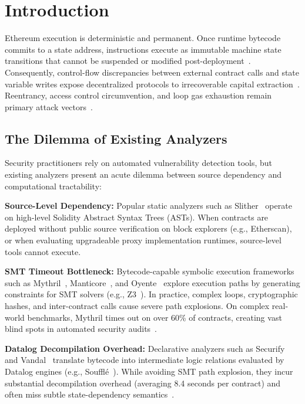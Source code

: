 \documentclass[conference]{IEEEtran}
\begin{document}
\section{Introduction}\label{sec:intro}

Ethereum execution is deterministic and permanent. Once runtime bytecode commits to a state address, instructions execute as immutable machine state transitions that cannot be suspended or modified post-deployment~\cite{wood2014ethereum}. Consequently, control-flow discrepancies between external contract calls and state variable writes expose decentralized protocols to irrecoverable capital extraction~\cite{zhou2023sok,chen2020survey,atzei2017survey}. Reentrancy, access control circumvention, and loop gas exhaustion remain primary attack vectors~\cite{daian2020flash}.

\subsection{The Dilemma of Existing Analyzers}
Security practitioners rely on automated vulnerability detection tools, but existing analyzers present an acute dilemma between source dependency and computational tractability:

\smallskip
\noindent\textbf{Source-Level Dependency:} Popular static analyzers such as Slither~\cite{feist2019slither} operate on high-level Solidity Abstract Syntax Trees (ASTs). When contracts are deployed without public source verification on block explorers (e.g., Etherscan), or when evaluating upgradeable proxy implementation runtimes, source-level tools cannot execute.

\smallskip
\noindent\textbf{SMT Timeout Bottleneck:} Bytecode-capable symbolic execution frameworks such as Mythril~\cite{mueller2018mythril}, Manticore~\cite{mossberg2019manticore}, and Oyente~\cite{luu2016making} explore execution paths by generating constraints for SMT solvers (e.g., Z3~\cite{de2008z3}). In practice, complex loops, cryptographic hashes, and inter-contract calls cause severe path explosions. On complex real-world benchmarks, Mythril times out on over 60\% of contracts, creating vast blind spots in automated security audits~\cite{durieux2020empirical}.

\smallskip
\noindent\textbf{Datalog Decompilation Overhead:} Declarative analyzers such as Securify~\cite{tsankov2018securify} and Vandal~\cite{brent2018vandal} translate bytecode into intermediate logic relations evaluated by Datalog engines (e.g., Souffl{\'e}~\cite{scholz2016souffle}). While avoiding SMT path explosion, they incur substantial decompilation overhead (averaging 8.4 seconds per contract) and often miss subtle state-dependency semantics~\cite{ghaleb2020how}.
\end{document}
